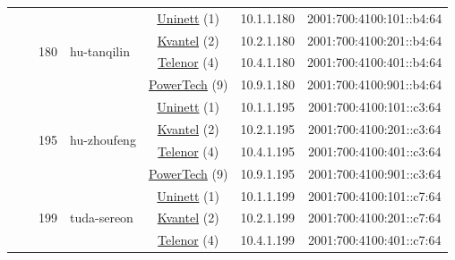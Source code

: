 \begin{small}
\begin{center}
\begin{longtable}{|c|c|c|c|c|c|c|c|}
  &  & \multirow{4}{*}{\tiny{180}} & \multicolumn{1}{|l|}{\multirow{4}{*}{\tiny{hu-tanqilin}}} & \multicolumn{2}{|c|}{\tiny{\href{https://www.uninett.no}{Uninett} (1)}} & \tiny{10.1.1.180} & \tiny{2001:700:4100:101::b4:64} \\* \cline{5-5}\cline{6-6}\cline{7-7}\cline{8-8}
  &  &  &  & \multicolumn{2}{|c|}{\tiny{\href{http://kvantel.no}{Kvantel} (2)}} & \tiny{10.2.1.180} & \tiny{2001:700:4100:201::b4:64} \\* \cline{5-5}\cline{6-6}\cline{7-7}\cline{8-8}
  &  &  &  & \multicolumn{2}{|c|}{\tiny{\href{https://www.telenor.no}{Telenor} (4)}} & \tiny{10.4.1.180} & \tiny{2001:700:4100:401::b4:64} \\* \cline{5-5}\cline{6-6}\cline{7-7}\cline{8-8}
  &  &  &  & \multicolumn{2}{|c|}{\tiny{\href{http://www.powertech.no}{PowerTech} (9)}} & \tiny{10.9.1.180} & \tiny{2001:700:4100:901::b4:64} \\* \cline{3-3}\cline{4-4}\cline{5-5}\cline{6-6}\cline{7-7}\cline{8-8}
  &  & \multirow{4}{*}{\tiny{195}} & \multicolumn{1}{|l|}{\multirow{4}{*}{\tiny{hu-zhoufeng}}} & \multicolumn{2}{|c|}{\tiny{\href{https://www.uninett.no}{Uninett} (1)}} & \tiny{10.1.1.195} & \tiny{2001:700:4100:101::c3:64} \\* \cline{5-5}\cline{6-6}\cline{7-7}\cline{8-8}
  &  &  &  & \multicolumn{2}{|c|}{\tiny{\href{http://kvantel.no}{Kvantel} (2)}} & \tiny{10.2.1.195} & \tiny{2001:700:4100:201::c3:64} \\* \cline{5-5}\cline{6-6}\cline{7-7}\cline{8-8}
  &  &  &  & \multicolumn{2}{|c|}{\tiny{\href{https://www.telenor.no}{Telenor} (4)}} & \tiny{10.4.1.195} & \tiny{2001:700:4100:401::c3:64} \\* \cline{5-5}\cline{6-6}\cline{7-7}\cline{8-8}
  &  &  &  & \multicolumn{2}{|c|}{\tiny{\href{http://www.powertech.no}{PowerTech} (9)}} & \tiny{10.9.1.195} & \tiny{2001:700:4100:901::c3:64} \\* \cline{3-3}\cline{4-4}\cline{5-5}\cline{6-6}\cline{7-7}\cline{8-8}
  &  & \multirow{4}{*}{\tiny{199}} & \multicolumn{1}{|l|}{\multirow{4}{*}{\tiny{tuda-sereon}}} & \multicolumn{2}{|c|}{\tiny{\href{https://www.uninett.no}{Uninett} (1)}} & \tiny{10.1.1.199} & \tiny{2001:700:4100:101::c7:64} \\* \cline{5-5}\cline{6-6}\cline{7-7}\cline{8-8}
  &  &  &  & \multicolumn{2}{|c|}{\tiny{\href{http://kvantel.no}{Kvantel} (2)}} & \tiny{10.2.1.199} & \tiny{2001:700:4100:201::c7:64} \\* \cline{5-5}\cline{6-6}\cline{7-7}\cline{8-8}
  &  &  &  & \multicolumn{2}{|c|}{\tiny{\href{https://www.telenor.no}{Telenor} (4)}} & \tiny{10.4.1.199} & \tiny{2001:700:4100:401::c7:64} \\* \cline{5-5}\cline{6-6}\cline{7-7}\cline{8-8}

\end{longtable}
\end{center}
\end{small}

